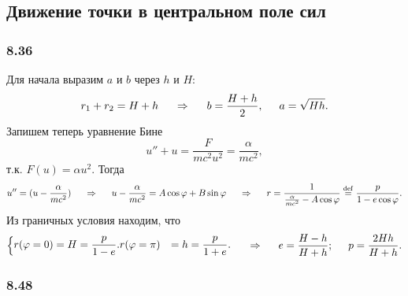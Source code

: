 \subsection{Движение точки в центральном поле сил}

\subsubsection*{8.36}
Для начала выразим $a$ и $b$ через $h$ и $H$:
\begin{equation}
    r_1 + r_2 = H+h 
    \hspace{0.5cm} \Rightarrow \hspace{0.5cm} 
    b = \frac{H+h}{2}, \hspace{0.5cm} a = \sqrt{Hh}.
\end{equation}
Запишем теперь уравнение Бине
\begin{equation}
    u'' + u = \frac{F}{mc^2u^2} = \frac{\alpha}{mc^2},
\end{equation}
т.к. $F(u) = \alpha u^2$. Тогда
\begin{equation}
    u'' = (u - \frac{\alpha}{mc^2} )
    \hspace{0.5cm} \Rightarrow \hspace{0.5cm} 
    u - \frac{\alpha}{mc^2} = A \cos \varphi + B \sin \varphi
    \hspace{0.5cm} \Rightarrow \hspace{0.5cm} 
    r = \frac{1}{\frac{\alpha}{mc^2} - A\cos \varphi} 
    \overset{\mathrm{def}}{=} \frac{p}{1-e\cos \varphi} .
\end{equation}
Из граничных условия находим, что
\begin{equation}
\left\{\begin{aligned}
    r(\varphi = 0) &= H = \frac{p}{1-e}.
    r(\varphi = \pi) &= h = \frac{p}{1+e}.
\end{aligned}\right.
\hspace{0.5cm} \Rightarrow \hspace{0.5cm} 
e = \frac{H-h}{H+h}; \hspace{0.5cm} p = \frac{2Hh}{H+h}.
\end{equation}



\subsubsection*{8.48}

